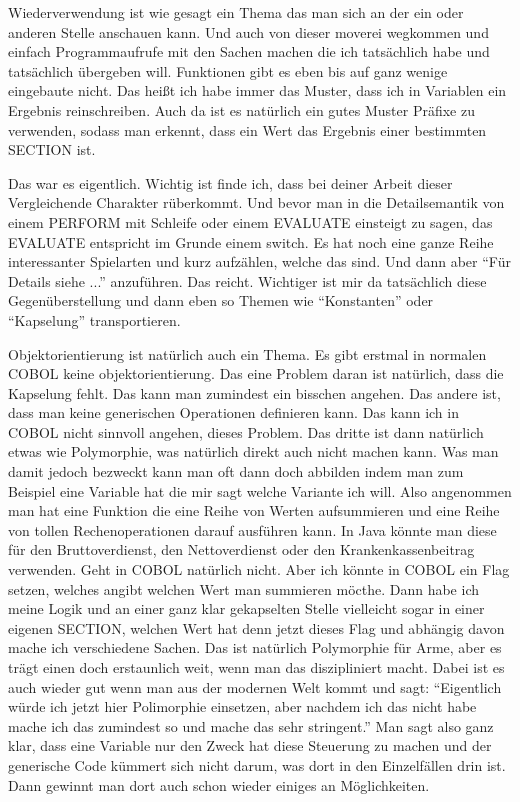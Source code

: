 {Wiederverwendung ist wie gesagt ein Thema das man sich an der ein oder anderen Stelle anschauen kann. Und auch von dieser moverei wegkommen und einfach Programmaufrufe mit den Sachen machen die ich tatsächlich habe und tatsächlich übergeben will. Funktionen gibt es eben bis auf ganz wenige eingebaute nicht. Das heißt ich habe immer das Muster, dass ich in Variablen ein Ergebnis reinschreiben. Auch da ist es natürlich ein gutes Muster Präfixe zu verwenden, sodass man erkennt, dass ein Wert das Ergebnis einer bestimmten SECTION ist.
\medskip

Das war es eigentlich. Wichtig ist finde ich, dass bei deiner Arbeit dieser Vergleichende Charakter rüberkommt. Und bevor man in die Detailsemantik von einem PERFORM mit Schleife oder einem EVALUATE einsteigt zu sagen, das EVALUATE entspricht im Grunde einem switch. Es hat noch eine ganze Reihe interessanter Spielarten und kurz aufzählen, welche das sind. Und dann aber ``Für Details siehe ...'' anzuführen. Das reicht. Wichtiger ist mir da tatsächlich diese Gegenüberstellung und dann eben so Themen wie ``Konstanten'' oder ``Kapselung'' transportieren.
\medskip

Objektorientierung ist natürlich auch ein Thema. Es gibt erstmal in normalen COBOL keine objektorientierung. Das eine Problem daran ist natürlich, dass die Kapselung fehlt. Das kann man zumindest ein bisschen angehen. Das andere ist, dass man keine generischen Operationen definieren kann. Das kann ich in COBOL nicht sinnvoll angehen, dieses Problem. Das dritte ist dann natürlich etwas wie Polymorphie, was natürlich direkt auch nicht machen kann. Was man damit jedoch bezweckt kann man oft dann doch abbilden indem man zum Beispiel eine Variable hat die mir sagt welche Variante ich will. Also angenommen man hat eine Funktion die eine Reihe von Werten aufsummieren und eine Reihe von tollen Rechenoperationen darauf ausführen kann. In Java könnte man diese für den Bruttoverdienst, den Nettoverdienst oder den Krankenkassenbeitrag verwenden. Geht in COBOL natürlich nicht. Aber ich könnte in COBOL ein Flag setzen, welches angibt welchen Wert man summieren möcthe. Dann habe ich meine Logik und an einer ganz klar gekapselten Stelle vielleicht sogar in einer eigenen SECTION, welchen Wert hat denn jetzt dieses Flag und abhängig davon mache ich verschiedene Sachen. Das ist natürlich Polymorphie für Arme, aber es trägt einen doch erstaunlich weit, wenn man das diszipliniert macht. Dabei ist es auch wieder gut wenn man aus der modernen Welt kommt und sagt: ``Eigentlich würde ich jetzt hier Polimorphie einsetzen, aber nachdem ich das nicht habe mache ich das zumindest so und mache das sehr stringent.'' Man sagt also ganz klar, dass eine Variable nur den Zweck hat diese Steuerung zu machen und der generische Code kümmert sich nicht darum, was dort in den Einzelfällen drin ist. Dann gewinnt man dort auch schon wieder einiges an Möglichkeiten.
\medskip

}
